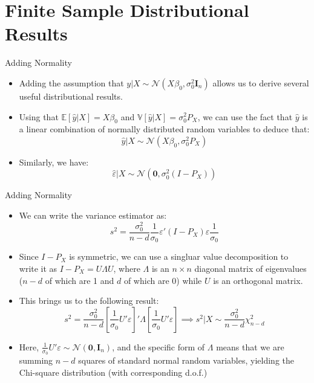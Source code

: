 \documentclass[fleqn, 10pt]{beamer}
\newcommand{\E}{\mathbb{E}}
\newcommand{\V}{\mathbb{V}}
\begin{document}
\section{Finite Sample Distributional Results}

\begin{frame}{Adding Normality}
	
	\begin{itemize}
		\item Adding the assumption that \( y|X \sim \mathcal{N}\left( X\beta_0, \sigma_0^2 \mathbf{I}_n \right) \) allows us to derive several useful distributional results.
		\item Using that \( \E[\hat{y}|X] = X\beta_0 \) and \( \V[\hat{y}|X] = \sigma_0^2 P_{X} \), we can use the fact that \(\hat{y}\) is a linear combination of normally distributed random variables to deduce that:
		\[ \hat{y}|X \sim \mathcal{N}(X\beta_0, \sigma_0^2 P_{X}) \]
		\item Similarly, we have:
		\[ \hat{\varepsilon}|X \sim \mathcal{N}(\mathbf{0}, \sigma_0^2 (I-P_{X})) \]
	\end{itemize}
	
\end{frame}


\begin{frame}{Adding Normality}
	
	\begin{itemize}
		\item We can write the variance estimator as:
		\[ s^2 = \frac{\sigma_0^2}{n-d} \frac{1}{\sigma_0} \varepsilon' (I-P_{X}) \varepsilon \frac{1}{\sigma_0} \]
		\item Since \(I-P_{X}\) is symmetric, we can use a singluar value decomposition to write it as \( I - P_{X} = U \Lambda U \), where \(\Lambda \) is an \(n\times n\) diagonal matrix of eigenvalues (\(n-d\) of which are 1 and \(d\) of which are 0) while \(U\) is an orthogonal matrix.
		\item This brings us to the following result:
		\[ s^2 = \frac{\sigma_0^2}{n-d} \left[ \frac{1}{\sigma_0} U' \varepsilon \right]' \Lambda \left[ \frac{1}{\sigma_0} U' \varepsilon \right] \implies s^2|X \sim \frac{\sigma_0^2}{n-d} \chi^2_{n-d} \]
		\item Here, \( \frac{1}{\sigma_0}U'\varepsilon \sim \mathcal{N}(\mathbf{0},\mathbf{I}_n) \), and the specific form of \(\Lambda \) means that we are summing \(n-d\) squares of standard normal random variables, yielding the Chi-square distribution (with corresponding d.o.f.)
	\end{itemize}
	
\end{frame}
\end{document}
